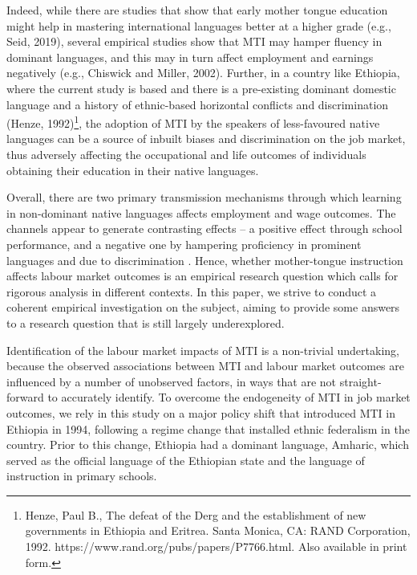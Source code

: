 Indeed, while there are studies that show that early mother tongue education might help in mastering international languages better at a higher grade (e.g., Seid, 2019), several empirical studies show that MTI may hamper fluency in dominant languages, and this may in turn affect employment and earnings negatively (e.g., Chiswick and Miller, 2002). Further, in a country like Ethiopia, where the current study is based and there is a pre-existing dominant domestic language and a history of ethnic-based horizontal conflicts and discrimination (Henze, 1992)\footnote{Henze, Paul B., The defeat of the Derg and the establishment of new governments in Ethiopia and Eritrea. Santa Monica, CA: RAND Corporation, 1992. https://www.rand.org/pubs/papers/P7766.html. Also available in print form.},  the adoption of MTI by the speakers of less-favoured native languages can be a source of inbuilt biases and discrimination on the job market, thus adversely affecting the occupational and life outcomes of individuals obtaining their education in their native languages. 

Overall, there are two primary transmission mechanisms through which learning in non-dominant native languages affects employment and wage outcomes. The channels appear to generate contrasting effects – a positive effect through school performance, and a negative one by hampering proficiency in prominent languages and due to discrimination . Hence, whether mother-tongue instruction affects labour market outcomes is an empirical research question which calls for rigorous analysis in different contexts. In this paper, we strive to conduct a coherent empirical investigation on the subject, aiming to provide some answers to a research question that is still largely underexplored. 

Identification of the labour market impacts of MTI is a non-trivial undertaking, because the observed associations between MTI and labour market outcomes are influenced by a number of unobserved factors, in ways that are not straight-forward to accurately identify. To overcome the endogeneity of MTI in job market outcomes, we rely in this study on a major policy shift that introduced MTI in Ethiopia in 1994, following a regime change that installed ethnic federalism in the country. Prior to this change, Ethiopia had a dominant language, Amharic, which served as the official language of the Ethiopian state and the language of instruction in primary schools. 

